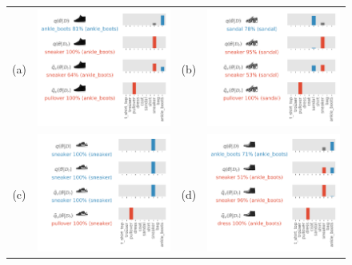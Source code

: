 \documentclass{article}
\theoremstyle{definition}
\begin{document}
\begin{figure}
\centering
\begin{tabular}{@{}c@{}cc@{}c@{}}
(a)
&
\includegraphics[height=0.4\textwidth]{img/fashionmnist/fashionmnist_29322.pdf}
&
(b)
&
\includegraphics[height=0.4\textwidth]{img/fashionmnist/fashionmnist_36790.pdf}
\\
(c)
&
\includegraphics[height=0.4\textwidth]{img/fashionmnist/fashionmnist_7189.pdf}
&
(d)
&
\includegraphics[height=0.4\textwidth]{img/fashionmnist/fashionmnist_23584.pdf}

\end{tabular}
\end{figure}
\end{document}
